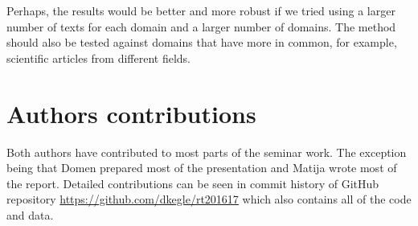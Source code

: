 \documentclass[12pt,a4paper]{amsart}
\begin{document}
Perhaps, the results would be better and more robust if we tried using a larger
number of texts for each domain and a larger number of domains. The method
should also be tested against domains that have more in common, for example,
scientific articles from different fields.

\section{Authors contributions}
Both authors have contributed to most parts of the seminar work. The exception
being that Domen prepared most of the presentation and Matija wrote most of the
report. Detailed contributions can be seen in commit history of GitHub
repository \url{https://github.com/dkegle/rt201617} which also contains all of
the code and data.




\end{document}
